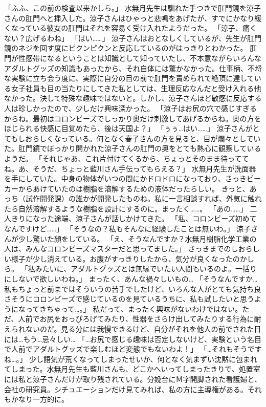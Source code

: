 「ふふ、この前の検査以来かしら。」
水無月先生は馴れた手つきで肛門鏡を涼子さんの肛門へと挿入した。涼子さんはひゃっと悲鳴をあげたが、すでにかなり緩くなっている彼女の肛門はそれを容易く受け入れたようだった。
「涼子、痛くない？広げるわね」
「はい……」
涼子さんはおとなしくしているが、先生が肛門鏡のネジを回す度にピクンピクンと反応しているのがはっきりとわかった。
肛門が性感帯になるということは知識として知っていたし、不本意ながらいろんなアダルトグッズの知識もあったから、それ自体には驚かなかった。仕事柄、不埒な実験に立ち会う度に、実際に自分の目の前で肛門を責められて絶頂に達している女子社員も目の当たりにしてきた私としては、生理反応なんだと受け入れる他なかった。決して特殊な趣味ではないと。しかし、涼子さんほど敏感に反応する人は珍しかったので、少しだけ興味深かった。
「涼子はお尻の穴で感じすぎるからね。最初はコロンビーズでしっかり奥だけ刺激してあげるからね。奥の方をほじられる快感に目覚めたら、後は天国よ？」
「ぅぅ…はい……」
涼子さんがとてもしおらしくなっている。何となく春子さんの方を見ると、目が爛々としていた。肛門鏡でぽっかり開かれた涼子さんの肛門の奥をとても熱心に観察しているようだ。
「それじゃあ、これ片付けてくるから、ちょっとそのまま待っててね。あ、そうだ、ちょっと藍川さん手伝ってもらえる？」
水無月先生が洗面器を手にしていた。中身の物体がいつの間にかドロドロになっており、さっきビーカーからあけていたのは樹脂を溶解するための液体だったらしい。
きっと、あっち（試作開発課）の誰かが開発したものね。私に一言相談すれば、外気に触れたら自然溶解するような樹脂を設計にするのに。まったく……。
「あの……」
二人きりになった途端、涼子さんが話しかけてきた。
「私、コロンビーズ初めてなんですけど……」
「そうなの？私もそんなに経験したことは無いわ。」
涼子さんが少し驚いた顔をしている。
「え、そうなんですか？水無月樹脂化学工業の人は、みんなコロンビーズマスターだと思ってました。」
さっきまでのしおらしい様子が少し消えている。お腹がすっきりしたから、気分が良くなったのかしら。
「私みたいに、アダルトグッズとは無縁でいたい人間もいるのよ。一括りにしないで欲しいわね。」
まったく、あんな禍々しいもの…
「そうなんですか…私もちょっと前まではそういうの苦手でしたけど、いろんな人がとても気持ち良さそうにコロンビーズで感じているのを見ているうちに、私も試したいと思うようになってきちゃって…。」
私だって、まったく興味がないわけではない。ただ、人前でお尻をおっぴろげてみたり、性器をさらけ出してみたりする行為に耐えられないのだ。見る分には我慢できるけど、自分がそれを他人の前でされた日には…もう…忌々しい…
「…お尻で感じる趣味は否定しないけど、実験という名目で人前でアダルトグッズで楽しむほど変態でもないわよ！」
「…それもそうですね…。」
少し語気が荒くなってしまったせいか、何となく気まずい沈黙に包まれてしまった。水無月先生も藍川さんも、どこかへいってしまったきりで、処置室には私と涼子さんだけが取り残されている。分娩台にＭ字開脚された看護婦と、会社の研究員。シチュエーションだけ見てみれば、私の方に主導権がある。それもかなり一方的に。

